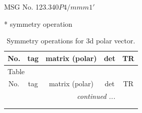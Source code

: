 \documentclass[fleqn,8pt]{jsarticle}
\begin{document}
\setcounter{MaxMatrixCols}{32}

\renewcommand{\tablename}{Table~}
\renewcommand{\figurename}{Figure~}
\begin{center}
\LARGE
MSG No. 123.340\quad$P4/mmm1'$
\end{center}
* symmetry operation
\renewcommand{\arraystretch}{1.3}
\begin{longtable}{ccccc}
\caption{Symmetry operations for 3d polar vector.}
 \\
 \hline \hline
No. & tag & matrix (polar) & det & TR \\ \hline \endfirsthead

\multicolumn{4}{l}{\tablename\ \thetable{}} \\
 \hline \hline
No. & tag & matrix (polar) & det & TR \\ \hline \endhead

 \hline \hline
\multicolumn{4}{r}{\footnotesize\it continued ...} \\ \endfoot

 \hline \hline
\multicolumn{4}{r}{} \\ \endlastfoot


\end{longtable}
\end{document}
